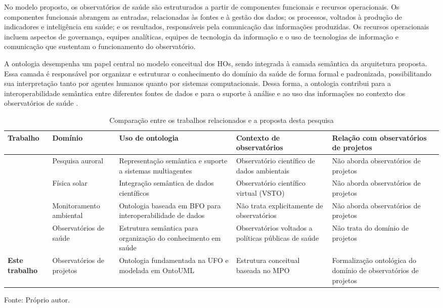No modelo proposto, os observatórios de saúde são estruturados a partir de componentes funcionais e recursos operacionais. Os componentes funcionais abrangem as entradas, relacionadas às fontes e à gestão dos dados; os processos, voltados à produção de indicadores e inteligência em saúde; e os resultados, responsáveis pela comunicação das informações produzidas. Os recursos operacionais incluem aspectos de governança, equipes analíticas, equipes de tecnologia da informação e o uso de tecnologias de informação e comunicação que sustentam o funcionamento do observatório.

A ontologia desempenha um papel central no modelo conceitual dos HOs, sendo integrada à camada semântica da arquitetura proposta. Essa camada é responsável por organizar e estruturar o conhecimento do domínio da saúde de forma formal e padronizada, possibilitando sua interpretação tanto por agentes humanos quanto por sistemas computacionais. Dessa forma, a ontologia contribui para a interoperabilidade semântica entre diferentes fontes de dados e para o suporte à análise e ao uso das informações no contexto dos observatórios de saúde \cite{yoshiura2018towards}.

\begin{table}[H]
\centering
\caption{Comparação entre os trabalhos relacionados e a proposta desta pesquisa}
\label{tab:comparacao_trabalhos}

\begin{tabularx}{\textwidth}{p{2.5cm} p{2.5cm} X X X}
\hline
\textbf{Trabalho} & \textbf{Domínio} & \textbf{Uso de ontologia} & \textbf{Contexto de observatórios} & \textbf{Relação com observatórios de projetos} \\
\hline
\citeauthor{chen2008apply} \cite{chen2008apply} 
& Pesquisa auroral 
& Representação semântica e suporte a sistemas multiagentes 
& Observatório científico de dados ambientais 
& Não aborda observatórios de projetos \\
\citeauthor{fox2009ontology} \cite{fox2009ontology} 
& Física solar 
& Integração semântica de dados científicos 
& Observatório científico virtual (VSTO) 
& Não aborda observatórios de projetos \\
\citeauthor{masmoudi2018ontology} \cite{masmoudi2018ontology} 
& Monitoramento ambiental 
& Ontologia baseada em BFO para interoperabilidade de dados 
& Não trata explicitamente de observatórios 
& Não aborda observatórios de projetos \\
\citeauthor{yoshiura2018towards} \cite{yoshiura2018towards} 
& Observatórios de saúde 
& Estrutura semântica para organização do conhecimento em saúde 
& Observatórios voltados a políticas públicas de saúde 
& Não trata do domínio de projetos \\
\textbf{Este trabalho}
& Observatórios de projetos 
& Ontologia fundamentada na UFO e modelada em OntoUML 
& Estrutura conceitual baseada no MPO 
& Formalização ontológica do domínio de observatórios de projetos \\
\hline
\end{tabularx}
Fonte: Próprio autor.
\end{table}

